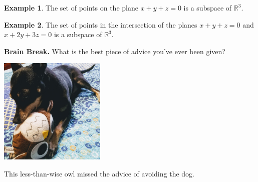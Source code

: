 \documentclass{beamer}
\newcommand{\R}{\mathbb{R}}
\newcommand{\fn}{\insertframenumber}
\theoremstyle{definition}
\newtheorem*{exa}{Example}
\begin{document}
\begin{frame}{\fn}
\begin{exa}
	The set of points on the plane $x+y+z=0$ is a subspace of $\R^3$.
\end{exa}
\begin{exa}
	The set of points in the intersection of the planes $x+y+z=0$ and $x+2y+3z=0$ is a subspace of $\R^3$.
\end{exa}
\end{frame}

\begin{frame}{\fn}
	\begin{block}{\textbf{Brain Break.}}
		What is the best piece of advice you’ve ever been given?
		\begin{center}
			\includegraphics[width=2in]{images/owl_Pepper}
			
			This less-than-wise owl missed the advice of avoiding the dog.
		\end{center}
	\end{block}	
\end{frame}
\end{document}
